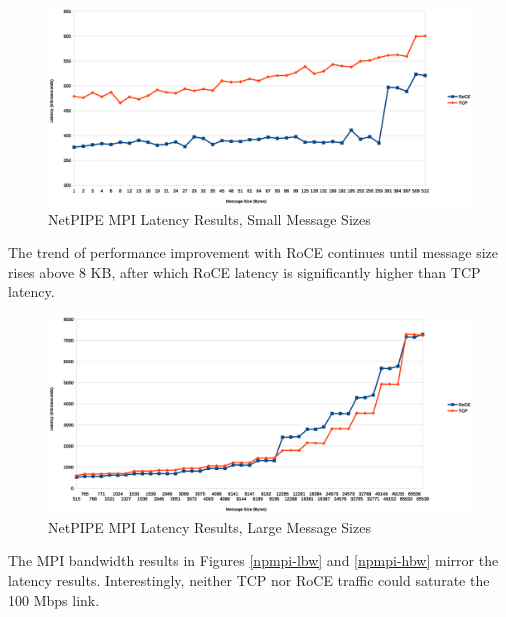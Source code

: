 \documentclass[a4paper]{article}
\begin{document}
\begin{figure}[H]
\includegraphics[width=\textwidth]{netpipe_lat_small}
\caption{NetPIPE MPI Latency Results, Small Message Sizes}
\label{npmpi-llat}
\end{figure}

The trend of performance improvement with RoCE continues until message size
rises above 8 KB, after which RoCE latency is significantly higher than TCP
latency. %

\begin{figure}[H]
\includegraphics[width=\textwidth]{netpipe_lat_large}
\caption{NetPIPE MPI Latency Results, Large Message Sizes}
\label{npmpi-hlat}
\end{figure}

The MPI bandwidth results in Figures \ref{npmpi-lbw} and \ref{npmpi-hbw} mirror
the latency results. Interestingly, neither TCP nor RoCE traffic could saturate
the 100 Mbps link. %
\end{document}
